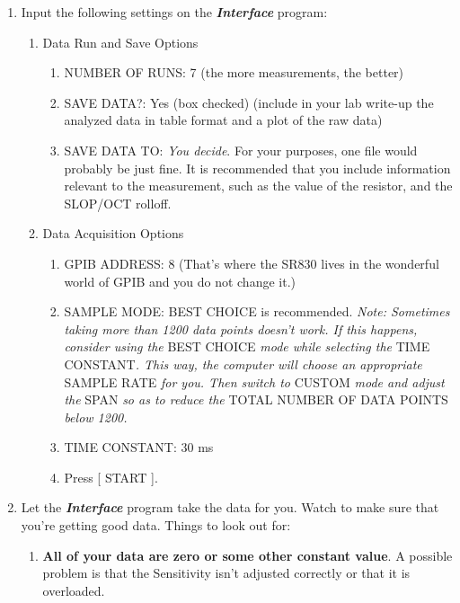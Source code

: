 \documentclass{../lab}
\begin{document}
\begin{enumerate}
    \item Input the following settings on the \emph{\textbf{Interface}} program:
    \begin{enumerate}
        \item Data Run and Save Options

    \begin{enumerate}
        \item NUMBER OF RUNS: 7 (the more measurements, the better)

        \item SAVE DATA?: Yes (box checked) (include in your lab write-up the analyzed data in table format and a plot of the raw data)

        \item SAVE DATA TO: \emph{You decide}. For your purposes, one file would probably be just fine. It is recommended that you include information relevant to the measurement, such as the value of the resistor, and the SLOP/OCT rolloff.

    \end{enumerate}

        \item Data Acquisition Options

        \begin{enumerate}
            \item GPIB ADDRESS: 8 (That's where the SR830 lives in the wonderful world of GPIB and you do not change it.)

            \item SAMPLE MODE: BEST CHOICE is recommended. \emph{Note: Sometimes taking more than 1200 data points doesn't work. If this happens, consider using the }BEST CHOICE\emph{ mode while selecting the }TIME CONSTANT\emph{. This way, the computer will choose an appropriate }SAMPLE RATE\emph{ for you. Then switch to }CUSTOM\emph{ mode and adjust }\emph{the }SPAN\emph{ so as to reduce the} TOTAL NUMBER OF DATA POINTS\emph{ below 1200.}

            \item TIME CONSTANT: 30 ms

            \item Press [ START ].

        \end{enumerate}

    \end{enumerate}

    \item Let the \emph{\textbf{Interface}} program take the data for you. Watch to make sure that you're getting good data. Things to look out for:
    \begin{enumerate}
        \item \textbf{All of your data are zero or some other constant value}. A possible problem is that the Sensitivity isn't adjusted correctly or that it is overloaded.


\end{enumerate}
\end{enumerate}
\end{document}
